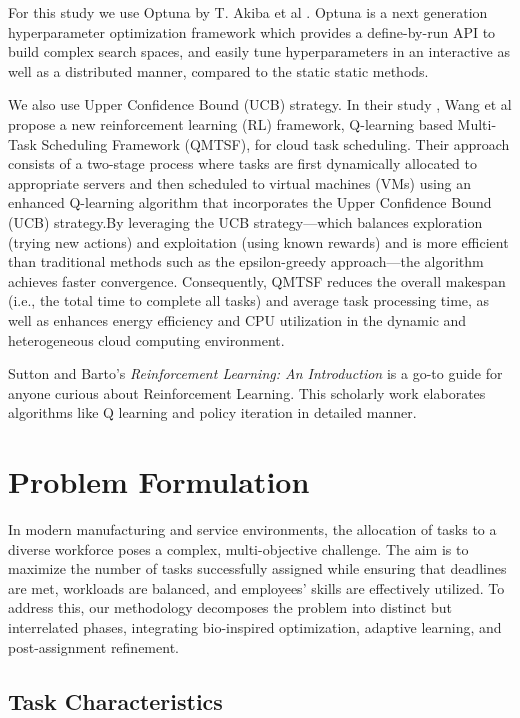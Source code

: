 \documentclass[%
aip,
cp,  %
amsmath,amssymb,
reprint,%
]{revtex4-2}
\begin{document}
	For this study we use Optuna by T. Akiba et al \cite{Akiba2019Optuna}. Optuna is a next generation hyperparameter optimization framework which provides a define-by-run API to build complex search spaces, and easily tune hyperparameters in an interactive as well as a distributed manner, compared to the static static methods.
	
	We also use Upper Confidence Bound (UCB) strategy. In their study \cite{Wang2023TaskScheduling}, Wang et al propose a new reinforcement learning (RL) framework, Q-learning based Multi-Task Scheduling Framework (QMTSF), for cloud task scheduling. Their approach consists of a two-stage process where tasks are first dynamically allocated to appropriate servers and then scheduled to virtual machines (VMs) using an enhanced Q-learning algorithm that incorporates the Upper Confidence Bound (UCB) strategy.By leveraging the UCB strategy—which balances exploration (trying new actions) and exploitation (using known rewards) and is more efficient than traditional methods such as the epsilon-greedy approach—the algorithm achieves faster convergence. Consequently, QMTSF reduces the overall makespan (i.e., the total time to complete all tasks) and average task processing time, as well as enhances energy efficiency and CPU utilization in the dynamic and heterogeneous cloud computing environment.
	
	Sutton and Barto’s \textit{Reinforcement Learning: An Introduction}\cite{SuttonBarto1998} is a go-to guide for anyone curious about Reinforcement Learning. This scholarly work elaborates algorithms like Q learning and policy iteration in detailed manner.
	
	
	\section{\label{sec:problem}Problem Formulation}
	
	In modern manufacturing and service environments, the allocation of tasks to a
	diverse workforce poses a complex, multi-objective challenge. The aim is to
	maximize the number of tasks successfully assigned while ensuring that
	deadlines are met, workloads are balanced, and employees' skills are
	effectively utilized. To address this, our methodology decomposes the problem
	into distinct but interrelated phases, integrating bio-inspired optimization,
	adaptive learning, and post-assignment refinement.
	
	\subsection{\label{subsec:task}Task Characteristics}
	
\end{document}

